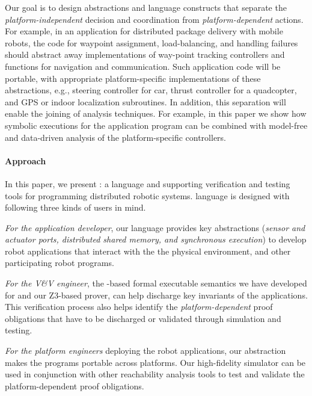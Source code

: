 Our goal is to design abstractions and language constructs that separate the \emph{platform-independent} decision and coordination from \emph{platform-dependent} actions.
For example, in an application for distributed package delivery with mobile robots,
the code for waypoint assignment, load-balancing, and handling failures should abstract away implementations of way-point tracking controllers and functions for navigation and communication.
Such application code will be portable, with appropriate platform-specific implementations of these abstractions,
e.g., steering controller for car, thrust controller for a quadcopter, and GPS or indoor localization subroutines.
%
In addition, this separation will enable the joining of analysis techniques.
For example, in this paper we show how symbolic executions for the application program can be combined with model-free and data-driven analysis of the platform-specific controllers.

\paragraph{Approach}
In this paper, we present \lgname: a language and supporting verification and testing tools for programming distributed robotic systems.
\lgname language is designed with following three kinds of users in mind.
\begin{noinditem}
\item \emph{For the application developer}, our \lgname language provides key abstractions (\emph{sensor and actuator ports, distributed shared memory, and synchronous execution})
      to develop robot applications that interact with the the physical environment, and other participating robot programs.
\item \emph{For the V\&V engineer}, the \K-based formal executable semantics we have developed for \lgname and our Z3-based prover,
      can help discharge key invariants of the \lgname applications.
      This verification process also helps identify the \emph{platform-dependent} proof obligations that have to be discharged or validated through simulation and testing.
\item \emph{For the platform engineers} deploying the robot applications, our abstraction makes the \lgname programs portable across platforms. Our high-fidelity \lgname simulator can be used in conjunction with other reachability analysis tools to test and validate the platform-dependent proof obligations.
\end{noinditem}

